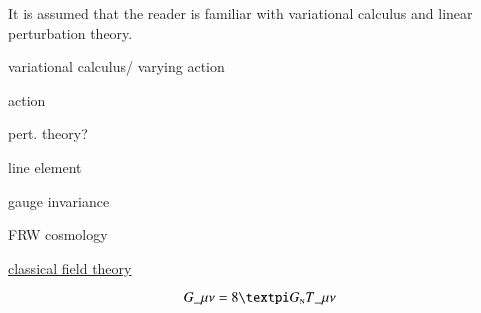 



It is assumed that the reader is familiar with variational calculus and linear perturbation theory.






\begin{bullets}
    \item variational calculus/ varying action
    \item action
    \item pert. theory?
    \item line element
    \item gauge invariance
    \item FRW cosmology
    \item \underline{classical field theory}
\end{bullets}



\begin{equation}
    G\_{\mu\nu} = 8\ppi G\nped{N} T\_{\mu\nu}
\end{equation}

